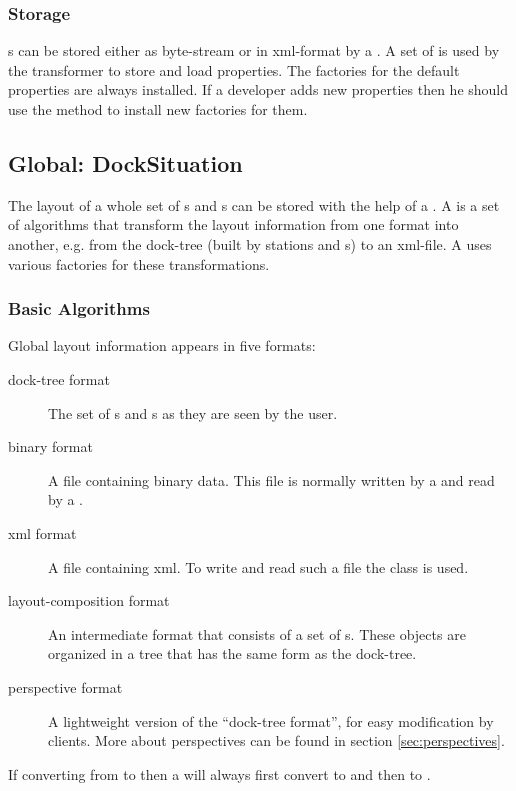 
\subsubsection{Storage}
s can be stored either as byte-stream or in xml-format by a . A set of  is used by the transformer to store and load properties. The factories for the default properties are always installed. If a developer adds new properties then he should use the method  to install new factories for them.


\subsection{Global: DockSituation}
The layout of a whole set of s and s can be stored with the help of a . A  is a set of algorithms that transform the layout information from one format into another, e.g. from the dock-tree (built by stations and s) to an xml-file. A  uses various factories for these transformations.


\subsubsection{Basic Algorithms}
Global layout information appears in five formats:
\begin{description}
 \item[dock-tree format] The set of s and s as they are seen by the user.
 \item[binary format] A file containing binary data. This file is normally written by a  and read by a .
 \item[xml format] A file containing xml. To write and read such a file the class  is used.
 \item[layout-composition format] An intermediate format that consists of a set of s. These objects are organized in a tree that has the same form as the dock-tree.
 \item[perspective format] A lightweight version of the ``dock-tree format'', for easy modification by clients. More about perspectives can be found in section \ref{sec:perspectives}.
\end{description}
If converting from  to  then a  will always first convert  to  and then  to .

